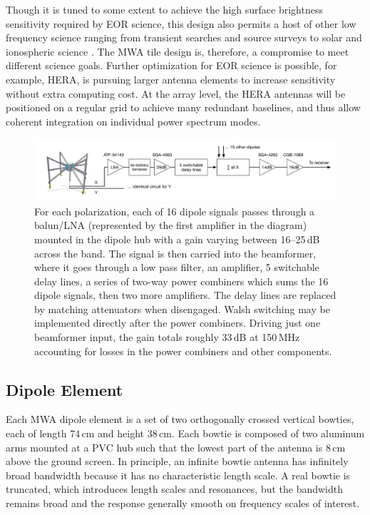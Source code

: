 \begin{subappendices}
Though it is tuned to some extent to achieve the high surface brightness sensitivity required by EOR science, this design also permits a host of other low frequency science ranging from transient searches and source surveys to solar and ionospheric science \citep{mwascience}. The MWA tile design is, therefore, a compromise to meet different science goals. Further optimization for EOR science is possible, for example, HERA, is pursuing larger antenna elements to increase sensitivity without extra computing cost. At the array level, the HERA antennas will be positioned on a regular grid to achieve many redundant baselines, and thus allow coherent integration on individual power spectrum modes.

\begin{figure}[h]
\includegraphics[width=7in]{chap2_beamforming_errors/beamformer_signal_path.pdf}
\caption[Beamformer signal path.]{For each polarization, each of 16 dipole signals passes through a balun/LNA (represented by the first amplifier in the diagram) mounted in the dipole hub with a gain varying between 16--25\,dB across the band. The signal is then carried into the beamformer, where it goes through a low pass filter, an amplifier, 5 switchable delay lines, a series of two-way power combiners which sums the 16 dipole signals, then two more amplifiers. The delay lines are replaced by matching attenuators when disengaged. Walsh switching may be implemented directly after the power combiners. Driving just one beamformer input, the gain totals roughly 33\,dB at 150\,MHz accounting for losses in the power combiners and other components. }
\label{fig:beamformersdiagram}
\end{figure}

\subsection{Dipole Element}

Each MWA dipole element is a set of two orthogonally crossed vertical bowties, each of length 74\,cm and height 38\,cm. Each bowtie is composed of two aluminum arms mounted at a PVC hub such that the lowest part of the antenna is 8\,cm above the ground screen. In principle, an infinite bowtie antenna has infinitely broad bandwidth because it has no characteristic length scale. A real bowtie is truncated, which introduces length scales and resonances, but the bandwidth remains broad and the response generally smooth on frequency scales of interest. 


\end{subappendices}
